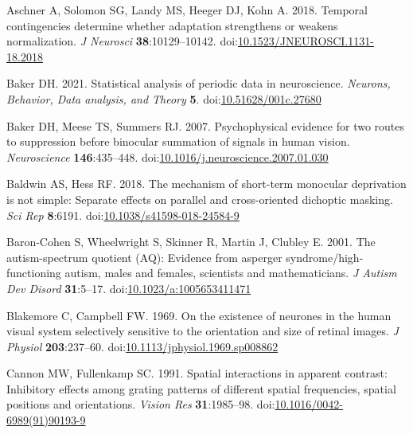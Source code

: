 \documentclass[
]{article}
\newlength{\cslhangindent}
\newlength{\cslentryspacingunit} %
\newenvironment{CSLReferences}[2] %
 {%
  \setlength{\parindent}{0pt}
  \ifodd #1
  \let\oldpar\par
  \def\par{\hangindent=\cslhangindent\oldpar}
  \fi
  \setlength{\parskip}{#2\cslentryspacingunit}
 }%
 {}
\begin{document}
\hypertarget{refs}{}
\begin{CSLReferences}{1}{0}
\leavevmode{}%
Aschner A, Solomon SG, Landy MS, Heeger DJ, Kohn A. 2018. Temporal contingencies determine whether adaptation strengthens or weakens normalization. \emph{J Neurosci} \textbf{38}:10129--10142. doi:\href{https://doi.org/10.1523/JNEUROSCI.1131-18.2018}{10.1523/JNEUROSCI.1131-18.2018}

\leavevmode{}%
Baker DH. 2021. Statistical analysis of periodic data in neuroscience. \emph{Neurons, Behavior, Data analysis, and Theory} \textbf{5}. doi:\href{https://doi.org/10.51628/001c.27680}{10.51628/001c.27680}

\leavevmode{}%
Baker DH, Meese TS, Summers RJ. 2007. Psychophysical evidence for two routes to suppression before binocular summation of signals in human vision. \emph{Neuroscience} \textbf{146}:435--448. doi:\href{https://doi.org/10.1016/j.neuroscience.2007.01.030}{10.1016/j.neuroscience.2007.01.030}

\leavevmode{}%
Baldwin AS, Hess RF. 2018. The mechanism of short-term monocular deprivation is not simple: Separate effects on parallel and cross-oriented dichoptic masking. \emph{Sci Rep} \textbf{8}:6191. doi:\href{https://doi.org/10.1038/s41598-018-24584-9}{10.1038/s41598-018-24584-9}

\leavevmode{}%
Baron-Cohen S, Wheelwright S, Skinner R, Martin J, Clubley E. 2001. The autism-spectrum quotient (AQ): Evidence from asperger syndrome/high-functioning autism, males and females, scientists and mathematicians. \emph{J Autism Dev Disord} \textbf{31}:5--17. doi:\href{https://doi.org/10.1023/a:1005653411471}{10.1023/a:1005653411471}

\leavevmode{}%
Blakemore C, Campbell FW. 1969. On the existence of neurones in the human visual system selectively sensitive to the orientation and size of retinal images. \emph{J Physiol} \textbf{203}:237--60. doi:\href{https://doi.org/10.1113/jphysiol.1969.sp008862}{10.1113/jphysiol.1969.sp008862}

\leavevmode{}%
Cannon MW, Fullenkamp SC. 1991. Spatial interactions in apparent contrast: Inhibitory effects among grating patterns of different spatial frequencies, spatial positions and orientations. \emph{Vision Res} \textbf{31}:1985--98. doi:\href{https://doi.org/10.1016/0042-6989(91)90193-9}{10.1016/0042-6989(91)90193-9}


\end{CSLReferences}
\end{document}
